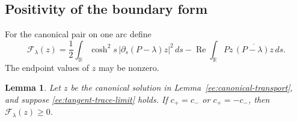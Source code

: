 \documentclass[reqno,11pt]{amsart}
\numberwithin{equation}{section}
\newtheorem{lemma}[theorem]{Lemma}
\theoremstyle{remark}
\begin{document}
\subsection{Positivity of the boundary form}

For the canonical pair on one arc define
\begin{equation}\label{ee:trace-form}
 \mathcal F_\lambda(z)
 =\frac12\int_{\mathbb R}\cosh^2s\,
                   |\partial_s(P-\lambda)z|^2\,ds
       -\operatorname{Re}\int_{\mathbb R}
                    Pz\,\overline{(P-\lambda)z}\,ds.
\end{equation}
The endpoint values of $z$ may be nonzero.

\begin{lemma}\label{ee:trace-positivity}
Let $z$ be the canonical solution in
Lemma~\ref{ee:canonical-transport}, and suppose
\eqref{ee:tangent-trace-limit} holds. If $c_+=c_-$ or
$c_+=-c_-$, then $\mathcal F_\lambda(z)\ge0$.
\end{lemma}
\end{document}
